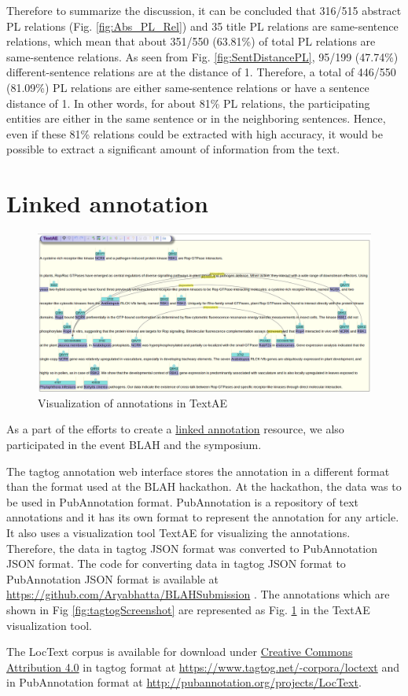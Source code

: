 
Therefore to summarize the discussion, it can be concluded that 316/515 abstract PL relations (Fig. \ref{fig:Abs_PL_Rel}) and 35 title PL relations are same-sentence relations, which mean that about 351/550 (63.81\%) of total PL relations are same-sentence relations. As seen from  Fig. \ref{fig:SentDistancePL}, 95/199 (47.74\%) different-sentence relations are at the distance of 1. Therefore, a total of 446/550 (81.09\%) PL relations are either same-sentence relations or have a sentence distance of 1. In other words, for about 81\% PL relations, the participating entities are either in the same sentence or in the neighboring sentences. Hence, even if these 81\% relations could be extracted with high accuracy, it would be possible to extract a significant amount of information from the text.

\section{Linked annotation}


\begin{figure}
\centering
\includegraphics[scale=0.25]{figures/TextAE_Vis.png}
\caption{Visualization of annotations in TextAE}\label{fig:TextAEVis}
\end{figure}

As a part of the efforts to create a \hyperref[http://2015.linkedannotation.org/background]{linked annotation} resource, we also participated in the event BLAH \cite{blah} and the symposium.

The tagtog annotation web interface stores the annotation in a different format than the format used at the BLAH hackathon. At the hackathon, the data was to be used in PubAnnotation format. PubAnnotation \cite{kim2012pubannotation} is a repository of text annotations and it has its own format to represent the annotation for any article. It also uses a visualization tool TextAE \cite{textae} for visualizing the annotations. Therefore, the data in tagtog JSON format was converted to PubAnnotation JSON format. The code for converting data in tagtog JSON format to PubAnnotation JSON format is available at \url{https://github.com/Aryabhatta/BLAHSubmission} \cite{blahsubmission}. The annotations which are shown in Fig \ref{fig:tagtogScreenshot} are represented as Fig. \ref{fig:TextAEVis} in the TextAE visualization tool.

The LocText corpus is available for download under \hyperref[https://creativecommons.org/licenses/by/4.0/]{Creative Commons Attribution 4.0} in tagtog format at \url{https://www.tagtog.net/-corpora/loctext}  and in PubAnnotation format at \url{http://pubannotation.org/projects/LocText}.